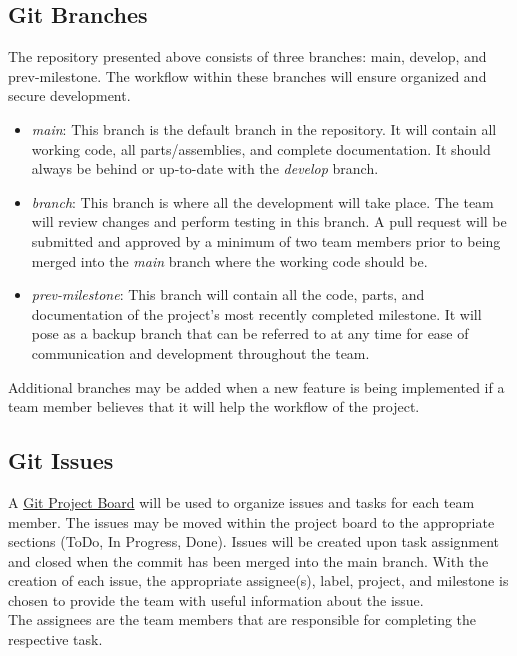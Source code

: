\documentclass{article}
\begin{document}
	\subsection{Git Branches}
	The repository presented above consists of three branches: main, develop, and prev-milestone. 
	The workflow within these branches will ensure organized and secure development.
	\begin{itemize}
		\item \emph{main}: This branch is the default branch in the repository. It will contain all working code, all parts/assemblies, and complete documentation. 
		It should always be behind or up-to-date with the \emph{develop} branch.
		\item \emph{branch}: This branch is where all the development will take place.
		 The team will review changes and perform testing in this branch. A pull request 
		 will be submitted and approved by a minimum of two team members prior to being 
		 merged into the \emph{main} branch where the working code should be.
		\item \emph{prev-milestone}: This branch will contain all the code, parts, and documentation 
		of the project’s most recently completed milestone. It will pose as a 
		backup branch that can be referred to at any time for ease of communication and 
		development throughout the team.
	\end{itemize}
	Additional branches may be added when a new feature is being implemented if a 
	team member believes that it will help the workflow of the project.

	\subsection{Git Issues}
	A \href{https://github.com/users/aaronbilly22/projects/1}{Git Project Board} will be used to organize 
	issues and tasks for each team member. The issues may be moved within the project board to the 
	appropriate sections (ToDo, In Progress, Done). Issues will be created upon task assignment and closed 
	when the commit has been merged into the main branch. With the creation of each issue, the appropriate assignee(s), label, project, and milestone is chosen
	to provide the team with useful information about the issue.\\

	\noindent The assignees are the team members that are responsible for completing the respective task.\\
\end{document}
